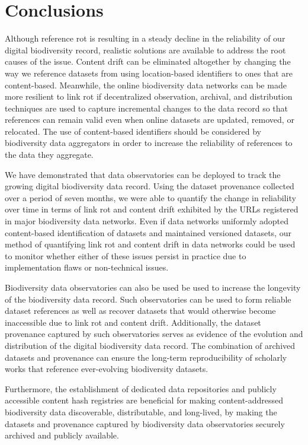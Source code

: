 \section*{Conclusions}
Although reference rot is resulting in a steady decline in the reliability of our digital biodiversity record, realistic solutions are available to address the root causes of the issue. Content drift can be eliminated altogether by changing the way we reference datasets from using location-based identifiers to ones that are content-based. Meanwhile, the online biodiversity data networks can be made more resilient to link rot if decentralized observation, archival, and distribution techniques are used to capture incremental changes to the data record so that references can remain valid even when online datasets are updated, removed, or relocated. The use of content-based identifiers should be considered by biodiversity data aggregators in order to increase the reliability of references to the data they aggregate.

We have demonstrated that data observatories can be deployed to track the growing digital biodiversity data record. Using the dataset provenance collected over a period of seven months, we were able to quantify the change in reliability over time in terms of link rot and content drift exhibited by the URLs registered in major biodiversity data networks. Even if data networks uniformly adopted content-based identification of datasets and maintained versioned datasets, our method of quantifying link rot and content drift in data networks could be used to monitor whether either of these issues persist in practice due to implementation flaws or non-technical issues.

Biodiversity data observatories can also be used be used to increase the longevity of the biodiversity data record. Such observatories can be used to form reliable dataset references as well as recover datasets that would otherwise become inaccessible due to link rot and content drift. Additionally, the dataset provenance captured by such observatories serves as evidence of the evolution and distribution of the digital biodiversity data record. The combination of archived datasets and provenance can ensure the long-term reproducibility of scholarly works that reference ever-evolving biodiversity datasets.

Furthermore, the establishment of dedicated data repositories and publicly accessible content hash registries are beneficial for making content-addressed biodiversity data discoverable, distributable, and long-lived, by making the datasets and provenance captured by biodiversity data observatories securely archived and publicly available.

